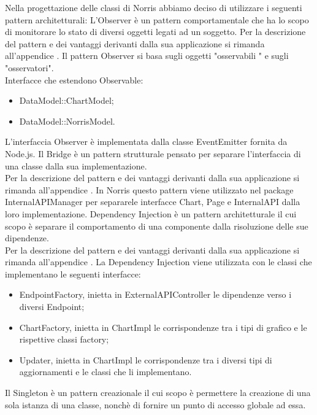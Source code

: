 		Nella progettazione delle classi di Norris abbiamo deciso di utilizzare i seguenti pattern architetturali:
	L'Observer è un pattern comportamentale che ha lo scopo di monitorare lo stato di diversi oggetti legati ad un soggetto.
	Per la descrizione del pattern e dei vantaggi derivanti dalla sua applicazione si rimanda all'appendice .
	Il pattern Observer si basa sugli oggetti "osservabili " e sugli "osservatori". \\
	Interfacce che estendono Observable:
	\begin{itemize}
	\item DataModel::ChartModel;
	\item DataModel::NorrisModel.
	\end{itemize}
	L'interfaccia Observer è implementata dalla classe EventEmitter fornita da Node.js.
	Il Bridge è un pattern strutturale pensato per separare l'interfaccia di una classe dalla sua implementazione.\\ Per la descrizione del pattern e dei vantaggi derivanti dalla sua applicazione si rimanda all'appendice .
	In Norris questo pattern viene utilizzato nel package InternalAPIManager per separarele interfacce Chart, Page e InternalAPI dalla loro implementazione.
	Dependency Injection è un pattern architetturale il cui scopo è separare il comportamento di una componente dalla risoluzione delle sue dipendenze.\\
	Per la descrizione del pattern e dei vantaggi derivanti dalla sua applicazione si rimanda all'appendice .
	La Dependency Injection viene utilizzata con le classi che implementano le seguenti interfacce:
	\begin{itemize}
	\item EndpointFactory, inietta in ExternalAPIController le dipendenze verso i diversi Endpoint;
	\item ChartFactory, inietta in ChartImpl le  corrispondenze tra i tipi di grafico e le rispettive classi factory;
	\item Updater, inietta in ChartImpl le corrispondenze tra i diversi tipi di aggiornamenti e le classi che li implementano.
	\end{itemize}
	Il Singleton è un pattern creazionale il cui scopo è permettere la creazione di una sola istanza di una classe, nonchè di fornire un punto di accesso globale ad essa.\\
